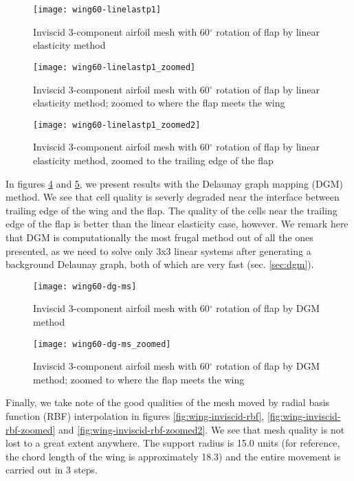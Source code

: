 \begin{figure}[!h]
	\centering
	\texttt{[image: wing60-linelastp1]}
	\caption{Inviscid 3-component airfoil mesh with 60$^\circ$ rotation of flap by linear elasticity method}
	\label{fig:wing-inviscid-linelastp1}
\end{figure}
\begin{figure}[!h]
	\centering
	\texttt{[image: wing60-linelastp1\_zoomed]}
	\caption{Inviscid 3-component airfoil mesh with 60$^\circ$ rotation of flap by linear elasticity method; zoomed to where the flap meets the wing}
	\label{fig:wing-inviscid-linelastp1-zoomed}
\end{figure}
\begin{figure}[!h]
	\centering
	\texttt{[image: wing60-linelastp1\_zoomed2]}
	\caption{Inviscid 3-component airfoil mesh with 60$^\circ$ rotation of flap by linear elasticity method, zoomed to the trailing edge of the flap}
	\label{fig:wing-inviscid-linelastp1-zoomed2}
\end{figure}

In figures \ref{fig:wing-inviscid-dg-ms} and \ref{fig:wing-inviscid-dg-ms-zoomed}, we present results with the Delaunay graph mapping (DGM) method. We see that cell quality is severly degraded near the interface between trailing edge of the wing and the flap. The quality of the cells near the trailing edge of the flap is better than the linear elasticity case, however. We remark here that DGM is computationally the most frugal method out of all the ones presented, as we need to solve only 3x3 linear systems after generating a background Delaunay graph, both of which are very fast (sec. \ref{sec:dgm}).

\begin{figure}[!h]
	\centering
	\texttt{[image: wing60-dg-ms]}
	\caption{Inviscid 3-component airfoil mesh with 60$^\circ$ rotation of flap by DGM method}
	\label{fig:wing-inviscid-dg-ms}
\end{figure}
\begin{figure}[!h]
	\centering
	\texttt{[image: wing60-dg-ms\_zoomed]}
	\caption{Inviscid 3-component airfoil mesh with 60$^\circ$ rotation of flap by DGM method; zoomed to where the flap meets the wing}
	\label{fig:wing-inviscid-dg-ms-zoomed}
\end{figure}

Finally, we take note of the good qualities of the mesh moved by radial basis function (RBF) interpolation in figures \ref{fig:wing-inviscid-rbf}, \ref{fig:wing-inviscid-rbf-zoomed} and \ref{fig:wing-inviscid-rbf-zoomed2}. We see that mesh quality is not lost to a  great extent anywhere. The support radius is 15.0 units (for reference, the chord length of the wing is approximately 18.3) and the entire movement is carried out in 3 steps.

